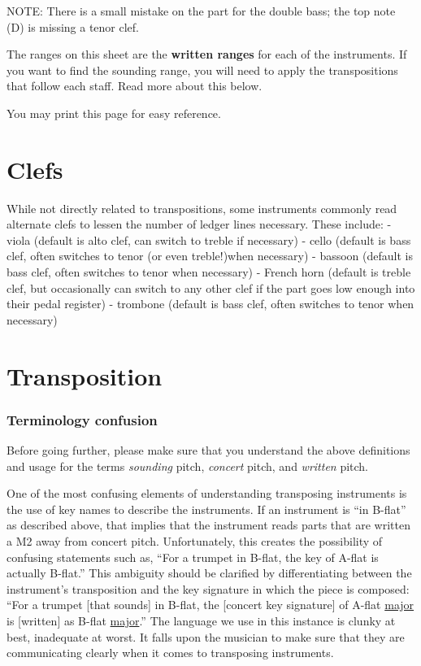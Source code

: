 \documentclass{book}
\begin{document}
NOTE: There is a small mistake on the part for the double bass; the top note
(D) is missing a tenor clef.

The ranges on this sheet are the \textbf{written ranges} for each of the
instruments. If you want to find the sounding range, you will need to apply
the transpositions that follow each staff. Read more about this below.

You may print this page for easy reference.

\hypertarget{clefs}{%
\chapter{Clefs}\label{clefs}}

While not directly related to transpositions, some instruments commonly read
alternate clefs to lessen the number of ledger lines necessary. These include:
- viola (default is alto clef, can switch to treble if necessary) - cello
(default is bass clef, often switches to tenor (or even treble!)when
necessary) - bassoon (default is bass clef, often switches to tenor when
necessary) - French horn (default is treble clef, but occasionally can switch
to any other clef if the part goes low enough into their pedal register) -
trombone (default is bass clef, often switches to tenor when necessary)

\hypertarget{transposition}{%
\chapter{Transposition}\label{transposition}}

\hypertarget{terminology-confusion}{%
\subsection{Terminology confusion}\label{terminology-confusion}}

Before going further, please make sure that you understand the above
definitions and usage for the terms \emph{sounding} pitch, \emph{concert}
pitch, and \emph{written} pitch.

One of the most confusing elements of understanding transposing instruments is
the use of key names to describe the instruments. If an instrument is ``in
B-flat'' as described above, that implies that the instrument reads parts that
are written a M2 away from concert pitch. Unfortunately, this creates the
possibility of confusing statements such as, ``For a trumpet in B-flat, the
key of A-flat is actually B-flat.'' This ambiguity should be clarified by
differentiating between the instrument's transposition and the key signature
in which the piece is composed: ``For a trumpet {[}that sounds{]} in B-flat,
the {[}concert key signature{]} of A-flat \protect\hyperlink{major}{major} is
{[}written{]} as B-flat \protect\hyperlink{major}{major}.'' The language we
use in this instance is clunky at best, inadequate at worst. It falls upon the
musician to make sure that they are communicating clearly when it comes to
transposing instruments.
\end{document}
